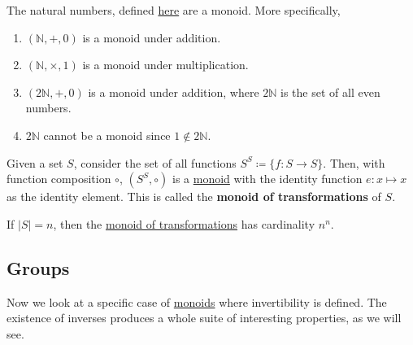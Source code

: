   \begin{example}
    \label{ex:n-is-a-monoid}
    The natural numbers, defined \hyperref[st-def:naturals]{here} are a monoid. More specifically, 
    \begin{enumerate}
      \item $(\mathbb{N}, +, 0)$ is a monoid under addition. 
      \item $(\mathbb{N}, \times, 1)$ is a monoid under multiplication. 
      \item $(2\mathbb{N}, +, 0)$ is a monoid under addition, where $2\mathbb{N}$ is the set of all even numbers. 
      \item $2\mathbb{N}$ cannot be a monoid since $1 \not\in 2\mathbb{N}$. 
    \end{enumerate}
  \end{example}

  \begin{definition}
    \label{def:monoid-of-transformations}
    Given a set $S$, consider the set of all functions $S^S \coloneqq \{f: S \rightarrow S\}$. Then, with function composition $\circ$, $(S^S, \circ)$ is a \hyperref[def:monoid]{monoid} with the identity function $e: x \mapsto x$ as the identity element. This is called the \textbf{monoid of transformations} of $S$. 
  \end{definition} 

  \begin{theorem}
    \label{thm:cardinality-of-monoid-of-transformations}
    If $|S| = n$, then the \hyperref[def:monoid-of-transformations]{monoid of transformations} has cardinality $n^n$. 
  \end{theorem}

\subsection{Groups} 

  Now we look at a specific case of \hyperref[def:monoid]{monoids} where invertibility is defined. The existence of inverses produces a whole suite of interesting properties, as we will see. 
  
